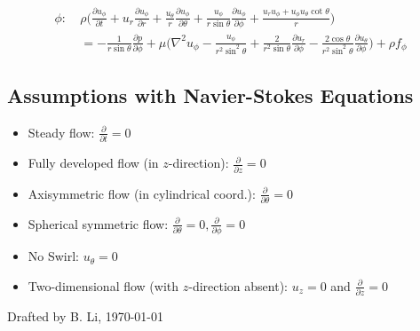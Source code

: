 \documentclass[a4paper]{article}
\begin{document}
\begin{itemize}
            \begin{equation*}
            \begin{split}
            \phi: \ & \rho \bigg(\frac{\partial u_{\phi}}{\partial t} + u_{r} \frac{\partial u_{\phi}}{\partial r} + \frac{u_{\theta}}{r} \frac{\partial u_{\phi}}{\partial \theta} + \frac{u_{\phi}}{r\sin \theta} \frac{\partial u_{\phi}}{\partial \phi} + \frac{u_{r}u_{\phi}+u_{\phi}u_{\theta}\cot\theta}{r} \bigg) \\
            & = -\frac{1}{r\sin\theta}\frac{\partial p}{\partial \phi} + \mu \bigg( \nabla^{2}u_{\phi} - \frac{u_{\phi}}{r^{2}\sin^{2}\theta} + \frac{2}{r^{2}\sin \theta}\frac{\partial u_{r}}{\partial \phi} - \frac{2\cos \theta}{r^{2}\sin^{2}\theta}\frac{\partial u_{\theta}}{\partial \phi} \bigg) + \rho f_{\phi}
            \end{split}  
            \end{equation*}
        \end{itemize}

    \subsection{Assumptions with Navier-Stokes Equations}
    \begin{multicols}{2}
    \begin{itemize}
        \item Steady flow: $\displaystyle \frac{\partial}{\partial t} = 0$
        
        \item Fully developed flow (in $z$-direction): $\displaystyle \frac{\partial}{\partial z} = 0$
        
        \item Axisymmetric flow  (in cylindrical coord.): $\displaystyle \frac{\partial}{\partial \theta} = 0$
        
        \item Spherical symmetric flow: $\displaystyle \frac{\partial}{\partial \theta} = 0, \frac{\partial}{\partial \phi} = 0$
        
        \item No Swirl: $u_{\theta} = 0$
        
        \item Two-dimensional flow (with $z$-direction absent): $\displaystyle u_{z}=0$ and $\displaystyle \frac{\partial}{\partial z} = 0$
    \end{itemize}
    \end{multicols}
    
\vfill
{\small \color{gray}Drafted by B. Li, \today}

\end{document}

